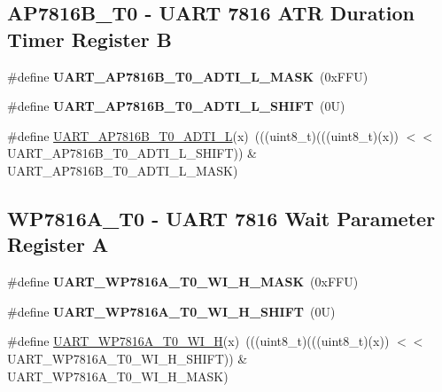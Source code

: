 \subsection*{A\+P7816\+B\+\_\+\+T0 -\/ U\+A\+RT 7816 A\+TR Duration Timer Register B}
\begin{DoxyCompactItemize}
\item 
\mbox{\label{group___u_a_r_t___register___masks_ga106b58f80480cffc2abf9b65ad884b37}} 
\#define {\bfseries U\+A\+R\+T\+\_\+\+A\+P7816\+B\+\_\+\+T0\+\_\+\+A\+D\+T\+I\+\_\+\+L\+\_\+\+M\+A\+SK}~(0x\+F\+F\+U)
\item 
\mbox{\label{group___u_a_r_t___register___masks_gab7a62b7b779d0d8464a1f1fb43357a46}} 
\#define {\bfseries U\+A\+R\+T\+\_\+\+A\+P7816\+B\+\_\+\+T0\+\_\+\+A\+D\+T\+I\+\_\+\+L\+\_\+\+S\+H\+I\+FT}~(0\+U)
\item 
\#define \mbox{\hyperlink{group___u_a_r_t___register___masks_ga68bd535b3ad544b5a9bb603fed834668}{U\+A\+R\+T\+\_\+\+A\+P7816\+B\+\_\+\+T0\+\_\+\+A\+D\+T\+I\+\_\+L}}(x)~(((uint8\+\_\+t)(((uint8\+\_\+t)(x)) $<$$<$ U\+A\+R\+T\+\_\+\+A\+P7816\+B\+\_\+\+T0\+\_\+\+A\+D\+T\+I\+\_\+\+L\+\_\+\+S\+H\+I\+FT)) \& U\+A\+R\+T\+\_\+\+A\+P7816\+B\+\_\+\+T0\+\_\+\+A\+D\+T\+I\+\_\+\+L\+\_\+\+M\+A\+SK)
\end{DoxyCompactItemize}
\subsection*{W\+P7816\+A\+\_\+\+T0 -\/ U\+A\+RT 7816 Wait Parameter Register A}
\begin{DoxyCompactItemize}
\item 
\mbox{\label{group___u_a_r_t___register___masks_ga79d0b4b5371d39d518daab659778e675}} 
\#define {\bfseries U\+A\+R\+T\+\_\+\+W\+P7816\+A\+\_\+\+T0\+\_\+\+W\+I\+\_\+\+H\+\_\+\+M\+A\+SK}~(0x\+F\+F\+U)
\item 
\mbox{\label{group___u_a_r_t___register___masks_gacb138b26718a9aebf77f1b99cfee0924}} 
\#define {\bfseries U\+A\+R\+T\+\_\+\+W\+P7816\+A\+\_\+\+T0\+\_\+\+W\+I\+\_\+\+H\+\_\+\+S\+H\+I\+FT}~(0\+U)
\item 
\#define \mbox{\hyperlink{group___u_a_r_t___register___masks_ga7aece2206d6a0c77bbc9d1e9f90841dd}{U\+A\+R\+T\+\_\+\+W\+P7816\+A\+\_\+\+T0\+\_\+\+W\+I\+\_\+H}}(x)~(((uint8\+\_\+t)(((uint8\+\_\+t)(x)) $<$$<$ U\+A\+R\+T\+\_\+\+W\+P7816\+A\+\_\+\+T0\+\_\+\+W\+I\+\_\+\+H\+\_\+\+S\+H\+I\+FT)) \& U\+A\+R\+T\+\_\+\+W\+P7816\+A\+\_\+\+T0\+\_\+\+W\+I\+\_\+\+H\+\_\+\+M\+A\+SK)
\end{DoxyCompactItemize}
